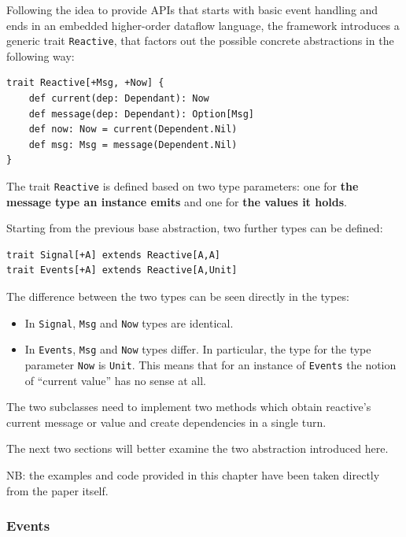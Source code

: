 Following the idea to provide APIs that starts with basic event handling
and ends in an embedded higher-order dataflow language, the framework
introduces a generic trait \texttt{Reactive}, that factors out the
possible concrete abstractions in the following way:

\begin{verbatim}
trait Reactive[+Msg, +Now] {
    def current(dep: Dependant): Now
    def message(dep: Dependant): Option[Msg]
    def now: Now = current(Dependent.Nil)
    def msg: Msg = message(Dependent.Nil)
}
\end{verbatim}

The trait \texttt{Reactive} is defined based on two type parameters: one
for \textbf{the message type an instance emits} and one for \textbf{the
values it holds}.

Starting from the previous base abstraction, two further types can be
defined:

\begin{verbatim}
trait Signal[+A] extends Reactive[A,A]
trait Events[+A] extends Reactive[A,Unit]
\end{verbatim}

The difference between the two types can be seen directly in the types:

\begin{itemize}
\itemsep1pt\parskip0pt
\item
  In \texttt{Signal}, \texttt{Msg} and \texttt{Now} types are identical.
\item
  In \texttt{Events}, \texttt{Msg} and \texttt{Now} types differ. In
  particular, the type for the type parameter \texttt{Now} is
  \texttt{Unit}. This means that for an instance of \texttt{Events} the
  notion of ``current value'' has no sense at all.
\end{itemize}

The two subclasses need to implement two methods which obtain reactive's current message or value and create dependencies in a single
turn.

The next two sections will better examine the two abstraction introduced
here.

NB: the examples and code provided in this chapter have been taken
directly from the paper itself.

\subsubsection{Events}\label{events}

